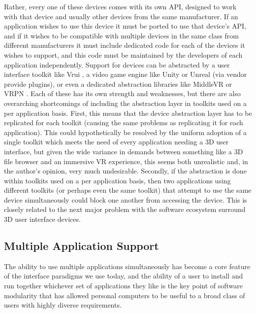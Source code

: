 Rather, every one of these devices comes with its own API, designed to work with that device and usually other devices from the same manufacturer. If an application wishes to use this device it must be ported to use that device’s API, and if it wishes to be compatible with multiple devices in the same class from different manufacturers it must include dedicated code for each of the devices it wishes to support, and this code must be maintained by the developers of each application independently. Support for devices can be abstracted by a user interface toolkit like Vrui \cite{vrui}, a video game engine like Unity or Unreal (via vendor provide plugins), or even a dedicated abstraction libraries like MiddleVR \cite{middle-vr} or VRPN \cite{vrpn}. Each of these has its own strength and weaknesses, but there are also overarching shortcomings of including the abstraction layer in toolkits used on a per application basis. First, this means that the device abstraction layer has to be replicated for each toolkit (causing the same problems as replicating it for each application). This could hypothetically be resolved by the uniform adoption of a single toolkit which meets the need of every application needing a 3D user interface, but given the wide variance in demands between something like a 3D file browser and an immersive VR experience, this seems both unrealistic and, in the author’s opinion, very much undesirable. Secondly, if the abstraction is done within toolkits used on a per application basis, then two applications using different toolkits (or perhaps even the same toolkit) that attempt to use the same device simultaneously could block one another from accessing the device. This is closely related to the next major problem with the software ecosystem surround 3D user interface devices.

\subsection{Multiple Application Support}

The ability to use multiple applications simultaneously has become a core feature of the interface paradigms we use today, and the ability of a user to install and run together whichever set of applications they like is the key point of software modularity that has allowed personal computers to be useful to a broad class of users with highly diverse requirements.
 
